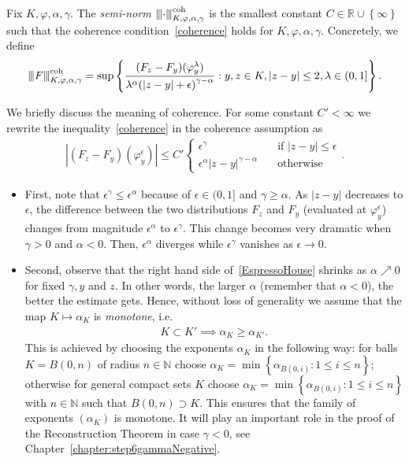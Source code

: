 Fix \(K, \varphi, \alpha, \gamma\). The \emph{semi-norm \({\left\vert\kern-0.25ex\left\vert\kern-0.25ex\left\vert\cdot \right\vert\kern-0.25ex\right\vert\kern-0.25ex\right\vert}^{\mathrm{coh}}_{K,\varphi,\alpha,\gamma}\)} is the smallest constant \(C \in \mathbb{R} \cup \left\{ \infty \right\}\) such that the coherence condition~\eqref{coherence} holds for \(K, \varphi, \alpha, \gamma\). Concretely, we define
\begin{align*}
    \vertiii{F}^{\mathrm{coh}}_{K,\varphi,\alpha,\gamma} = \sup \left\{ \frac{(F_z - F_y)(\varphi^\lambda_y)}{\lambda^\alpha{(|z-y| + \epsilon)}^{\gamma - \alpha}} : y,z \in K, |z-y| \leq 2, \lambda \in (0,1] \right\}. %
\end{align*}

We briefly discuss the meaning of coherence. For some constant \( C' < \infty \) we rewrite the inequality~\eqref{coherence} in the coherence assumption as
\begin{align}\label{EspressoHouse}
    |(F_z - F_y)(\varphi^\epsilon_y)| \leq C' \begin{cases}
        \epsilon^\gamma \quad & \text{if \(|z-y| \leq \epsilon\)} \\
        \epsilon^{\alpha} |z-y|^{\gamma - \alpha} \quad & \text{otherwise}
    \end{cases}.
\end{align}
\begin{itemize}
    \item First, note that \(\epsilon^{\gamma} \leq \epsilon^{\alpha}\) because of \(\epsilon \in (0,1] \) and \(\gamma \geq \alpha\). As \(|z-y|\) decreases to \(\epsilon\), the difference between the two distributions \(F_z\) and \(F_y\) (evaluated at \(\varphi^\epsilon_y\)) changes from magnitude \(\epsilon^\alpha\) to \(\epsilon^{\gamma}\). This change becomes very dramatic when \(\gamma > 0\) and \(\alpha < 0\). Then, \(\epsilon^{\alpha}\) diverges while \(\epsilon^{\gamma}\) vanishes as \(\epsilon \to 0\).
    \item Second, observe that the right hand side of~\eqref{EspressoHouse} shrinks as \(\alpha \nearrow 0\) for fixed \(\gamma, y\) and \(z\). In other words, the larger \(\alpha\) (remember that \(\alpha < 0\)), the better the estimate gets. Hence, without loss of generality we assume that the map \(K \mapsto \alpha_K\) is \emph{monotone}, i.e. 
    \begin{align}\label{alpha-monotone}
        K \subset K' \implies \alpha_K \geq \alpha_{K'}.
    \end{align}
    This is achieved by choosing the exponents \(\alpha_K\) in the following way: for balls \(K = B(0,n)\) of radius \(n \in \mathbb{N}\) choose \(\alpha_K = \min\left\{ \alpha_{B(0,i)}  : 1\leq i \leq n\right\}\); otherwise for general compact sets \(K\) choose \(\alpha_K = \min\left\{ \alpha_{B(0,i)}  : 1\leq i \leq n\right\}\) with \(n \in \mathbb{N}\) such that  \(B(0,n) \supset K\). This ensures that the family of exponents \((\alpha_K)\) is monotone. It will play an important role in the proof of the Reconstruction Theorem in case \(\gamma < 0\), see Chapter~\ref{chapter:step6gammaNegative}.
\end{itemize}

